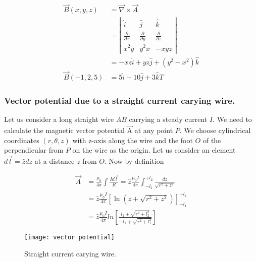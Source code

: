 \begin{answer}
	\begin{align*}
	\vec{B}(x, y, z)&=\vec{\nabla} \times \vec{A}\\&=\left|\begin{array}{ccc}
	\hat{i} & \hat{j} & \hat{k} \\
	\frac{\partial}{\partial x} & \frac{\partial}{\partial y} & \frac{\partial}{\partial z} \\
	x^{2} y & y^{2} x & -x y z
	\end{array}\right|\\&=-x z \hat{i}+y z \hat{j}+\left(y^{2}-x^{2}\right) \hat{k}\\
	\vec{B}(-1,2,5)&=5 \hat{i}+10 \hat{j}+3 \hat{k} T
	\end{align*}
\end{answer}
\subsubsection{Vector potential due to a straight current carying wire.}
Let us consider a long straight wire $A B$ carrying a steady current $I$. We need to calculate the magnetic vector potential $\vec{\mathrm{A}}$ at any point $P .$ We choose cylindrical coordinates $(r, \theta, z)$ with z-axis along the wire and the foot $O$ of the perpendicular from $P$ on the wire as the origin. Let us consider an element $d \vec{l}=\hat{z} d z$ at a distance $z$ from $O$. Now by definition\\
\begin{minipage}{0.65\textwidth}
\begin{align*}
\vec{A}&=\frac{\mu_{0}}{4 \pi} \int \frac{I d \vec{l}}{R}=\hat{z} \frac{\mu_{0} I}{4 \pi} \int_{-l_{1}}^{+l_{2}} \frac{d z}{\sqrt{r^{2}+z^{2}}}\\&=\hat{z} \frac{\mu_{0} I}{4 \pi}\left[\ln \left(z+\sqrt{r^{2}+z^{2}}\right)\right]_{-l_{1}}^{+l_{2}}\\
&=\hat{z} \frac{\mu_{0} I}{4 \pi} l n\left[\frac{l_{2}+\sqrt{r^{2}+l_{2}^{2}}}{-l_{1}+\sqrt{r^{2}+l_{1}^{2}}}\right]
\end{align*}
\end{minipage}
\begin{minipage}{0.35\textwidth}
	\begin{figure}[H]
		\centering
		\texttt{[image: vector potential]}
		\caption{Straight current carying wire.}
		\label{Straight current carying wire.}
	\end{figure}
\end{minipage}
